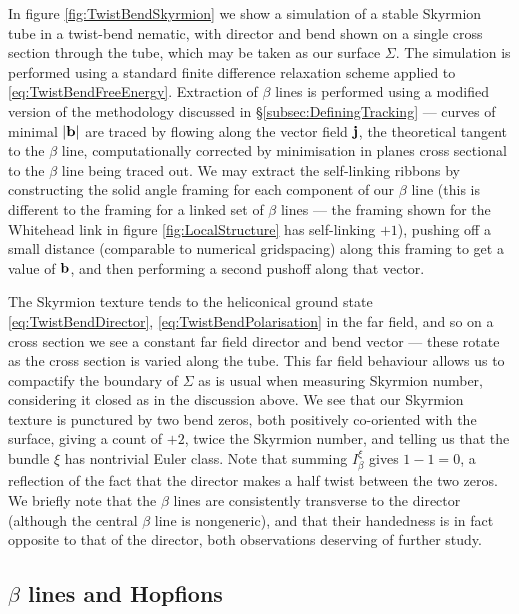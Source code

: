 {In figure \ref{fig:TwistBendSkyrmion} we show a simulation of a stable Skyrmion tube in a twist-bend nematic, with director and bend shown on a single cross section through the tube, which may be taken as our surface $\Sigma$. The simulation is performed using a standard finite difference relaxation scheme applied to \eqref{eq:TwistBendFreeEnergy}. Extraction of $\beta$ lines is performed using a modified version of the methodology discussed in \S\ref{subsec:DefiningTracking} --- curves of minimal $|\mathbf{b}|$ are traced by flowing along the vector field $\mathbf{j}$, the theoretical tangent to the $\beta$ line, computationally corrected by minimisation in planes cross sectional to the $\beta$ line being traced out. We may extract the self-linking ribbons by constructing the solid angle framing for each component of our $\beta$ line (this is different to the framing for a linked set of $\beta$ lines --- the framing shown for the Whitehead link in figure \ref{fig:LocalStructure} has self-linking $+1$), pushing off a small distance (comparable to numerical gridspacing) along this framing to get a value of $\mathbf{b}$, and then performing a second pushoff along that vector. 

The Skyrmion texture tends to the heliconical ground state \eqref{eq:TwistBendDirector}, \eqref{eq:TwistBendPolarisation} in the far field, and so on a cross section we see a constant far field director and bend vector --- these rotate as the cross section is varied along the tube. This far field behaviour allows us to compactify the boundary of $\Sigma$ as is usual when measuring Skyrmion number, considering it closed as in the discussion above. We see that our Skyrmion texture is punctured by two bend zeros, both positively co-oriented with the surface, giving a count of $+2$, twice the Skyrmion number, and telling us that the bundle $\xi$ has nontrivial Euler class. Note that summing $I^\xi_\beta$ gives $1-1=0$, a reflection of the fact that the director makes a half twist between the two zeros. We briefly note that the $\beta$ lines are consistently transverse to the director (although the central $\beta$ line is nongeneric), and that their handedness is in fact opposite to that of the director, both observations deserving of further study.

\subsection{$\beta$ lines and Hopfions}

}

